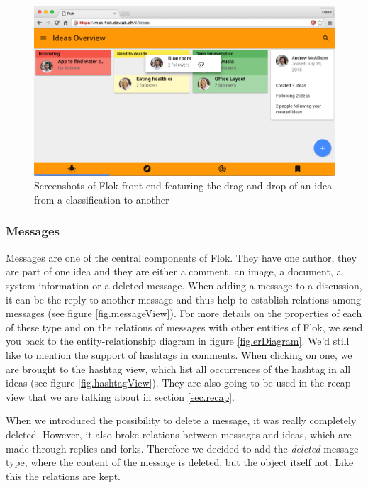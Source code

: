 \documentclass[a4paper,12pt, oneside]{article}
\begin{document}
\begin{figure}[!htb]
    \centering
    \includegraphics[width=\textwidth]{images/classificationDragAndDrop.png}
    \caption{Screenshots of Flok front-end featuring the drag and drop of an idea from a classification to another}
    \label{fig.classificationDragAndDrop}
\end{figure}

\FloatBarrier
\subsubsection{Messages}
\label{sec.messages}
Messages are one of the central components of Flok.
They have one author, they are part of one idea and they are either a comment, an image, a document, a system information or a deleted message.
When adding a message to a discussion, it can be the reply to another message and thus help to establish relations among messages (see figure \ref{fig.messageView}).
For more details on the properties of each of these type and on the relations of messages with other entities of Flok, we send you back to the entity-relationship diagram in figure \ref{fig.erDiagram}.
We'd still like to mention the support of hashtags in comments.
When clicking on one, we are brought to the hashtag view, which list all occurrences of the hashtag in all ideas (see figure \ref{fig.hashtagView}).
They are also going to be used in the recap view that we are talking about in section \ref{sec.recap}.

When we introduced the possibility to delete a message, it was really completely deleted.
However, it also broke relations between messages and ideas, which are made through replies and forks.
Therefore we decided to add the \emph{deleted} message type, where the content of the message is deleted, but the object itself not.
Like this the relations are kept.
\end{document}
